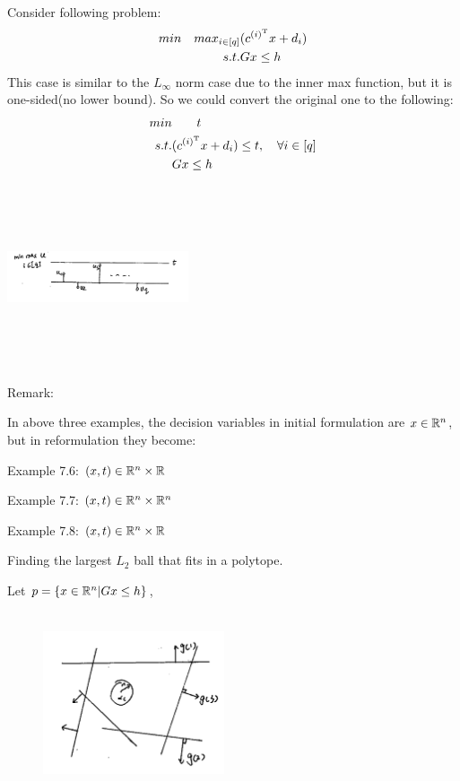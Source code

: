 \begin{example}
	Consider following problem:
	\begin{align*}
		min \quad max_{i\in [q]} &(c^{(i)^{{\rm T}}}x + d_i)\\
		s.t. &Gx\leq h
	\end{align*}
	This case is similar to the $L_\infty$ norm case due to the inner max function, but it is one-sided(no lower bound). So we could convert the original one to the following:
	\begin{align*}
		min  &\qquad t\\
		s.t. &(c^{(i)^{{\rm T}}}x + d_i)\leq t,\quad \forall i\in [q]\\
		&Gx\leq h
	\end{align*}
	\begin{marginfigure}
		\centering
		\includegraphics[width=2.1in,height=2.1in]{figures/ch07/figure1016_5.png}
	\end{marginfigure}
\end{example}

Remark:

In above three examples, the decision variables in initial formulation are $x\in \mathbb{R}^n$, but in reformulation they become:

Example 7.6: $(x, t) \in \mathbb{R}^n \times \mathbb{R}$

Example 7.7: $(x, t) \in \mathbb{R}^n \times \mathbb{R}^n$

Example 7.8: $(x, t) \in \mathbb{R}^n \times \mathbb{R}$



\begin{example}
	Finding the largest $L_2$ ball that fits in a polytope.
	
	Let $p = \{x\in \mathbb{R}^n| Gx\leq h \}$,
	
	\begin{figure}
		\centering
		\includegraphics[width=2.1in,height=2.1in]{figures/ch07/figure1016_6.png}
	\end{figure}
\end{example}

